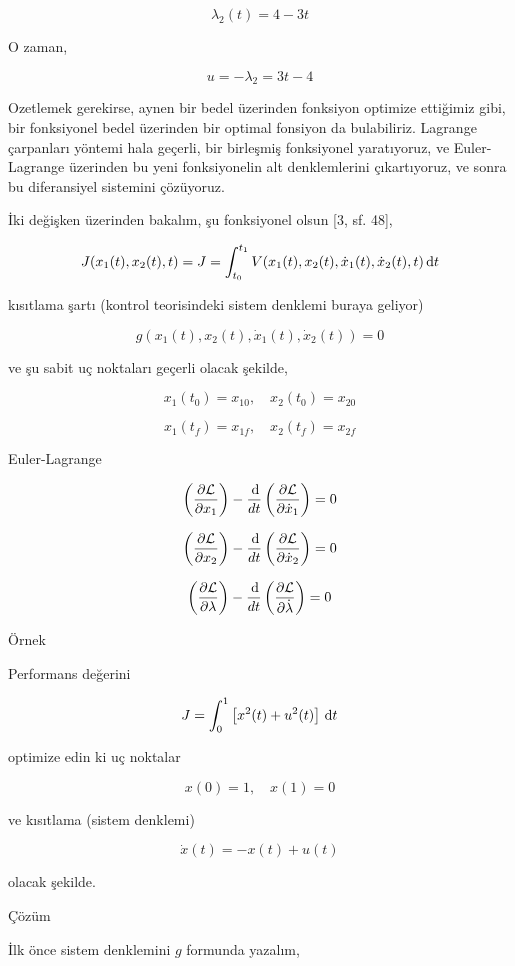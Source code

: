 \documentclass[12pt,fleqn]{article}\usepackage{../../common}
\begin{document}
$$
\lambda_{2}{\left(t \right)} = 4 - 3 t
$$

O zaman, 

$$
u = -\lambda_2 = 3t - 4
$$

Ozetlemek gerekirse, aynen bir bedel üzerinden fonksiyon optimize ettiğimiz
gibi, bir fonksiyonel bedel üzerinden bir optimal fonsiyon da
bulabiliriz. Lagrange çarpanları yöntemi hala geçerli, bir birleşmiş
fonksiyonel yaratıyoruz, ve Euler-Lagrange üzerinden bu yeni fonksiyonelin
alt denklemlerini çıkartıyoruz, ve sonra bu diferansiyel sistemini
çözüyoruz.

İki değişken üzerinden bakalım, şu fonksiyonel olsun [3, sf. 48], 

$$
J(x_1(t),x_2(t),t) = J = 
\int_{t_0}^{t_1} V(x_1(t), x_2(t), \dot{x}_1(t), \dot{x}_2(t), t) \,\mathrm{d} t
$$

kısıtlama şartı (kontrol teorisindeki sistem denklemi buraya geliyor)

$$
g(x_1(t), x_2(t), \dot{x}_1(t), \dot{x}_2(t)) = 0
$$

ve şu sabit uç noktaları geçerli olacak şekilde, 

$$
x_1(t_0) = x_{10}, \quad x_2(t_0) = x_{20}
$$

$$
x_1(t_f) = x_{1f}, \quad x_2(t_f) = x_{2f}
$$

Euler-Lagrange

$$
\left( \frac{\partial \mathcal{L}}{\partial x_1} \right) -
\frac{\,\mathrm{d}}{dt} \left( \frac{\partial \mathcal{L}}{\partial \dot{x}_1} \right) 
= 0
$$

$$
\left( \frac{\partial \mathcal{L}}{\partial x_2} \right) -
\frac{\,\mathrm{d}}{dt} \left( \frac{\partial \mathcal{L}}{\partial \dot{x}_2} \right) 
= 0
$$

$$
\left( \frac{\partial \mathcal{L}}{\partial \lambda} \right) -
\frac{\,\mathrm{d}}{dt} \left( \frac{\partial \mathcal{L}}{\partial \dot{\lambda}} \right) 
= 0
$$

Örnek

Performans değerini

$$
J = \int_{0}^{1} \left[ x^2(t) + u^2(t) \right] \,\mathrm{d} t
$$

optimize edin ki uç noktalar

$$
x(0) = 1, \quad x(1) = 0
$$

ve kısıtlama (sistem denklemi)

$$
\dot{x}(t) = -x(t) + u(t)
$$

olacak şekilde.

Çözüm

İlk önce sistem denklemini $g$ formunda yazalım,
\end{document}
